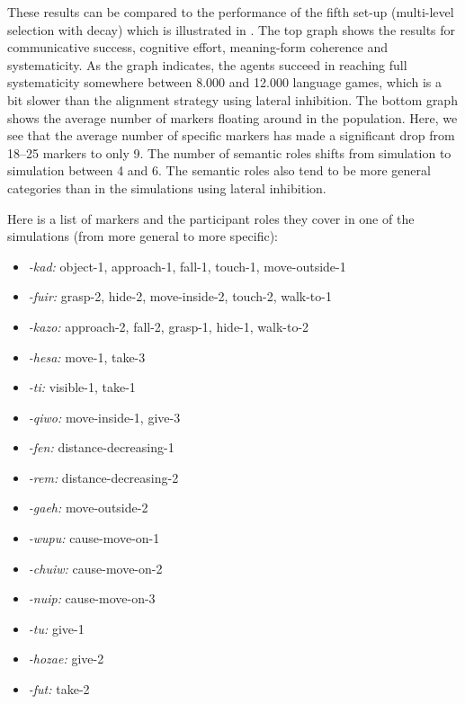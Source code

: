These results can be compared to the performance of the fifth set-up (multi-level selection with decay) which is illustrated in . The top graph shows the results for communicative success, cognitive effort, meaning-form coherence and systematicity. As the graph indicates, the agents succeed in reaching full systematicity somewhere between 8.000 and 12.000 language games, which is a bit slower than the alignment strategy using lateral inhibition. The bottom graph shows the average number of markers floating around in the population. Here, we see that the average number of specific markers has made a significant drop from 18--25 markers to only 9. The number of semantic roles shifts from simulation to simulation between 4 and 6. The semantic roles also tend to be more general categories than in the simulations using lateral inhibition.


Here is a list of markers and the participant roles they cover in one of the simulations (from more general to more specific):

\begin{itemize}
\item {\em -kad:} object-1, approach-1, fall-1, touch-1, move-outside-1
\item {\em -fuir:}  grasp-2, hide-2, move-inside-2, touch-2, walk-to-1
\item {\em -kazo:} approach-2, fall-2, grasp-1, hide-1, walk-to-2
\item {\em -hesa:} move-1, take-3
\item {\em -ti:} visible-1, take-1
\item {\em -qiwo:} move-inside-1, give-3
\item {\em -fen:} distance-decreasing-1
\item {\em -rem:} distance-decreasing-2
\item {\em -gaeh:} move-outside-2
\item {\em -wupu:} cause-move-on-1
\item {\em -chuiw:} cause-move-on-2
\item {\em -nuip:} cause-move-on-3
\item {\em -tu:} give-1
\item {\em -hozae:} give-2
\item {\em -fut:} take-2
\end{itemize}

